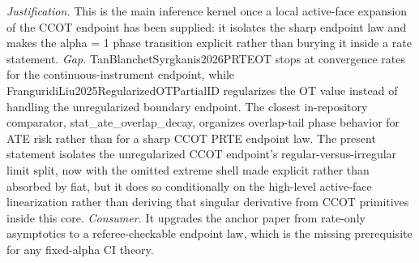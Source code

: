 \documentclass{article}
\begin{document}
\par\smallskip\noindent \textit{Justification.} This is the main inference kernel once a local active-face expansion of the CCOT endpoint has been supplied: it isolates the sharp endpoint law and makes the alpha = 1 phase transition explicit rather than burying it inside a rate statement. \textit{Gap.} TanBlanchetSyrgkanis2026PRTEOT stops at convergence rates for the continuous-instrument endpoint, while FranguridiLiu2025RegularizedOTPartialID regularizes the OT value instead of handling the unregularized boundary endpoint. The closest in-repository comparator, stat_ate_overlap_decay, organizes overlap-tail phase behavior for ATE risk rather than for a sharp CCOT PRTE endpoint law. The present statement isolates the unregularized CCOT endpoint's regular-versus-irregular limit split, now with the omitted extreme shell made explicit rather than absorbed by fiat, but it does so conditionally on the high-level active-face linearization rather than deriving that singular derivative from CCOT primitives inside this core. \textit{Consumer.} It upgrades the anchor paper from rate-only asymptotics to a referee-checkable endpoint law, which is the missing prerequisite for any fixed-alpha CI theory.
\end{document}
